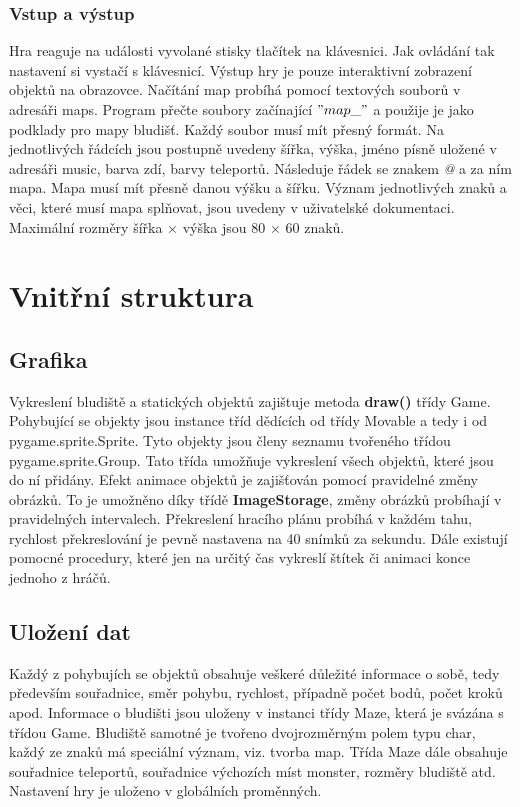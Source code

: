 \documentclass[10pt,a4paper]{article}
\begin{document}
\subsubsection{Vstup a výstup}
Hra reaguje na události vyvolané stisky tlačítek na klávesnici. Jak ovládání tak nastavení si vystačí s klávesnicí. Výstup hry je pouze interaktivní zobrazení objektů na obrazovce. Načítání map probíhá pomocí textových souborů v adresáři maps. Program přečte soubory začínající $"map\_"$ a použije je jako podklady pro mapy bludišť. Každý soubor musí mít přesný formát. Na jednotlivých řádcích jsou postupně uvedeny šířka, výška, jméno písně uložené v adresáři music, barva zdí, barvy teleportů. Následuje řádek se znakem \textit{@} a za ním mapa. Mapa musí mít přesně danou výšku a šířku. Význam jednotlivých znaků a věci, které musí mapa splňovat, jsou uvedeny v uživatelské dokumentaci. Maximální rozměry šířka $\times$ výška  jsou 80 $\times$ 60 znaků.
\section{Vnitřní struktura}
\subsection{Grafika}
Vykreslení bludiště a statických objektů zajištuje metoda \textbf{draw()} třídy Game. Pohybující se objekty jsou instance tříd dědících od třídy Movable a tedy i od pygame.sprite.Sprite. Tyto objekty jsou členy seznamu tvořeného třídou pygame.sprite.Group. Tato třída umožňuje vykreslení všech objektů, které jsou do ní přidány. Efekt animace objektů je zajišťován pomocí pravidelné změny obrázků. To je  umožněno díky třídě \textbf{ImageStorage}, změny obrázků probíhají v pravidelných intervalech. Překreslení hracího plánu probíhá v každém tahu, rychlost překreslování je  pevně nastavena na 40 snímků za sekundu. Dále existují pomocné procedury, které jen na určitý čas vykreslí štítek či animaci konce jednoho z hráčů.
\subsection{Uložení dat}
Každý z pohybujích se objektů obsahuje veškeré důležité informace o sobě, tedy především souřadnice, směr pohybu, rychlost, případně počet bodů, počet kroků apod. Informace o bludišti jsou uloženy v instanci třídy Maze, která je svázána s třídou Game. Bludiště samotné  je tvořeno dvojrozměrným polem typu char, každý ze znaků má speciální význam, viz. tvorba map. Třída Maze dále obsahuje souřadnice teleportů, souřadnice výchozích míst monster, rozměry bludiště atd. Nastavení hry je uloženo v globálních proměnných.
\end{document}
